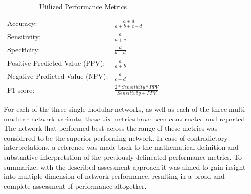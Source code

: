 \documentclass[12pt]{article}
\begin{document}
\bgroup
\def\arraystretch{1.8}%
\begin{table}[h]
\caption{Utilized Performance Metrics}
\label{table:metrics}
\begin{tabular}{ll}
\hline
Accuracy:                       & \(\frac{\!\!\!\!\!\!\!\!\!\!\!\!\!\!a+d}{a+b+c+d}\) \\
Sensitivity:                    & \(\frac{a}{a+c}\)                                   \\
Specificity:                    & \(\frac{d}{b+d}\)                                   \\
Positive Predicted Value (PPV): & \(\frac{a}{a+b}\)                                   \\
Negative Predicted Value (NPV):       & \(\frac{d}{c+d}\)                                   \\
F1-score:                     & \(\frac{2*Sensitivity*PPV}{Sensitivity+PPV}\)       \\ \hline
\end{tabular}
\end{table}
\egroup

For each of the three single-modular networks, as well as each of the three multi-modular network variants, these six metrics have been constructed and reported. The network that performed best across the range of these metrics was considered to be the superior performing network. In case of contradictory interpretations, a reference was made back to the mathematical definition and substantive interpretation of the previously delineated performance metrics. To summarize, with the described assessment approach it was aimed to gain insight into multiple dimension of network performance, resulting in a broad and complete assessment of performance altogether.     

\newpage


\end{document}

